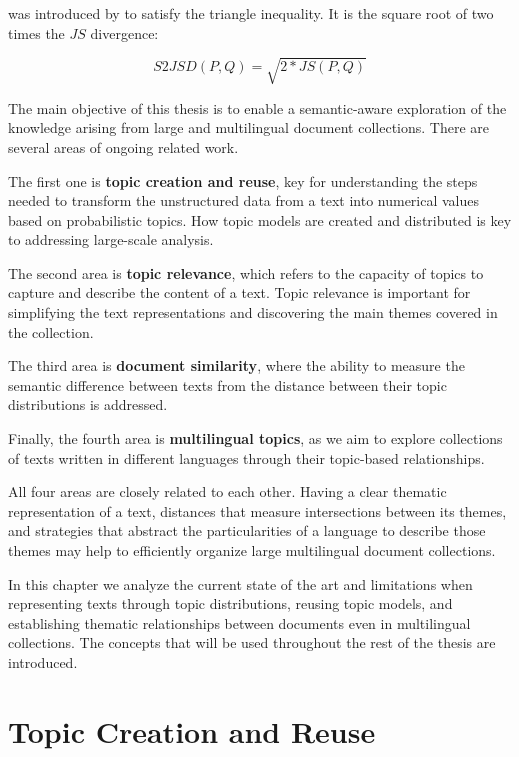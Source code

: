  was introduced by \cite{Endres2003} to satisfy the triangle inequality. It is the square root of two times the $JS$ divergence:

\begin{equation}
    S2JSD(P,Q) = \sqrt{2*JS(P,Q)}
\label{eq:s2jsd}
\end{equation}

The main objective of this thesis is to enable a semantic-aware exploration of the knowledge arising from large and multilingual document collections. There are several areas of ongoing related work.

The first one is \textbf{topic creation and reuse}, key for understanding the steps needed to transform the unstructured data from a text into numerical values based on probabilistic topics. How topic models are created and distributed is key to addressing large-scale analysis.

The second area is \textbf{topic relevance}, which refers to the capacity of topics to capture and describe the content of a text. Topic relevance is important for simplifying the text representations and discovering the main themes covered in the collection.

The third area is \textbf{document similarity}, where the ability to measure the semantic difference between texts from the distance between their topic distributions is addressed.

Finally, the fourth area is \textbf{multilingual topics}, as we aim to explore collections of texts written in different languages through their topic-based relationships. 

All four areas are closely related to each other. Having a clear thematic representation of a text, distances that measure intersections between its themes, and strategies that abstract the particularities of a language to describe those themes may help to efficiently organize large multilingual document collections.

In this chapter we analyze the current state of the art and limitations when representing texts through topic distributions, reusing topic models, and establishing thematic relationships between documents even in multilingual collections. The concepts that will be used throughout the rest of the thesis are introduced. 

\section{Topic Creation and Reuse}

